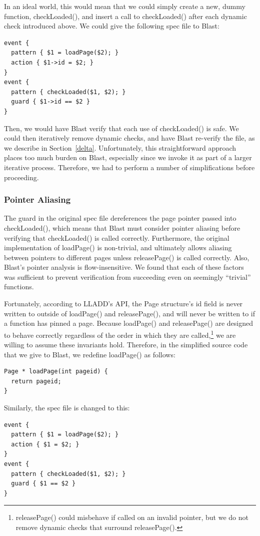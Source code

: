 \documentclass[10pt,letterpaper,twocolumn,english]{article}
\newcommand{\yad}{LLADD\xspace}
\newcommand{\pin}{loadPage()\xspace}
\newcommand{\unpin}{releasePage()\xspace}
\newcommand{\checkpage}{checkLoaded()\xspace}
\begin{document}
In an ideal world, this would mean that we could simply create a new,
dummy function, \checkpage, and insert a call to \checkpage
after each dynamic check introduced above.  We could give the
following spec file to Blast:

\begin{verbatim}
event { 
  pattern { $1 = loadPage($2); }
  action { $1->id = $2; }
}
event { 
  pattern { checkLoaded($1, $2); }  
  guard { $1->id == $2 }
}
\end{verbatim}

Then, we would have Blast verify that each use of \checkpage is safe.
We could then iteratively remove dynamic checks, and have Blast
re-verify the file, as we describe in Section~\ref{delta}.
Unfortunately, this straightforward approach places too much burden on
Blast, especially since we invoke it as part of a larger iterative
process.  Therefore, we had to perform a number of simplifications
before proceeding.

\subsubsection{Pointer Aliasing}

The guard in the original spec file dereferences the page pointer
passed into \checkpage, which means that Blast must consider pointer
aliasing before verifying that \checkpage is called correctly.
Furthermore, the original implementation of \pin is non-trivial, and
ultimately allows aliasing between pointers to different pages unless
\unpin is called correctly.  Also, Blast's pointer analysis is
flow-insensitive.  We found that each of these factors was sufficient
to prevent verification from succeeding even on seemingly ``trivial''
functions.  

Fortunately, according to \yad's API, the Page structure's id field is
never written to outside of \pin and \unpin, and will never be written
to if a function has pinned a page.  Because \pin and \unpin are
designed to behave correctly regardless of the order
in which they are called,\footnote{\unpin could misbehave if called on
an invalid pointer, but we do not remove dynamic checks that surround
\unpin.} we are willing to assume these invariants hold.  Therefore,
in the simplified source code that we give to Blast, we redefine
\pin as follows:

\begin{verbatim}
Page * loadPage(int pageid) {
  return pageid;
}
\end{verbatim}
Similarly, the spec file is changed to this:
\begin{verbatim}
event { 
  pattern { $1 = loadPage($2); }
  action { $1 = $2; }
}
event { 
  pattern { checkLoaded($1, $2); }  
  guard { $1 == $2 }
}
\end{verbatim}
\end{document}
